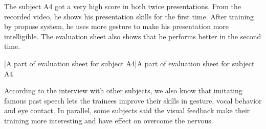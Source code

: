 \par The subject A4 got a very high score in both twice presentations. From the recorded video, he shows his presentation skills for the first time. After training by propose system, he uses more gesture to make his presentation more intelligible. The evaluation sheet also shows that he performs better in the second time.    

[A part of evaluation sheet for subject A4]{A part of evaluation sheet for subject A4}

\par According to the interview with other subjects, we also know that imitating famous past speech lets the trainees improve their skills in gesture, vocal behavior and eye contact. In parallel, some subjects said the visual feedback make their training more interesting and have effect on overcome the nervous.
